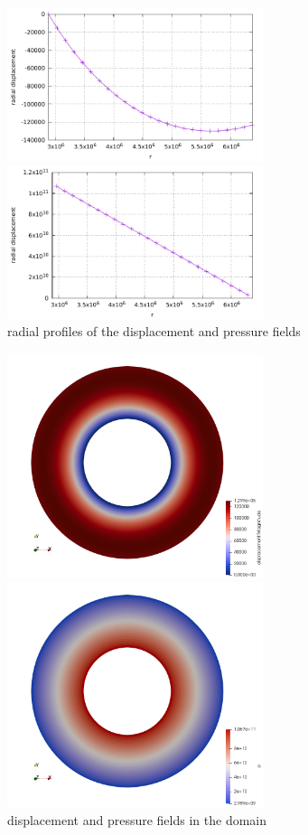 \begin{center}
\includegraphics[width=7.5cm]{python_codes/fieldstone_36/displacement_rtheta.pdf}
\includegraphics[width=7.5cm]{python_codes/fieldstone_36/pressure_rtheta.pdf}\\
{\small radial profiles of the displacement and pressure fields}
\end{center}

\begin{center}
\includegraphics[width=7.5cm]{python_codes/fieldstone_36/disp}
\includegraphics[width=7.5cm]{python_codes/fieldstone_36/p}\\
{\small displacement and pressure fields in the domain}
\end{center}

